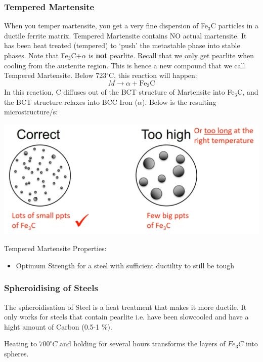 \documentclass[12pt]{article}
\begin{document}
\subsubsection{Tempered Martensite}
When you temper martensite, you get a very fine dispersion of Fe$_3$C particles in a ductile ferrite matrix.
Tempered Martensite contains NO actual martensite.
It has been heat treated (tempered) to `push' the metastable phase into stable phases.
Note that Fe$_3$C$+\alpha$ is \textbf{not} pearlite. 
Recall that we only get pearlite when cooling from the austenite region.
This is hence a new compound that we call Tempered Martensite.
Below 723$^\circ$C, this reaction will happen:
\begin{equation*}
  M \rightarrow \alpha + \text{Fe}_3\text{C}
\end{equation*}
In this reaction, C diffuses out of the BCT structure of Martensite into Fe$_3$C, and the BCT structure relaxes into BCC Iron ($\alpha$).
Below is the resulting microstructure/s:

\includegraphics[scale=0.3]{martensite}

Tempered Martensite Properties:
\begin{itemize}
  \item Optimum Strength for a steel with sufficient ductility to still be tough
\end{itemize}

\subsubsection{Spheroidising of Steels}
The spheroidisation of Steel is a heat treatment that makes it more ductile.
It only works for steels that contain pearlite i.e. have been slowcooled and have a hight amount of Carbon (0.5-1 \%).

\begin{center}
Heating to $700^\circ C$ and holding for several hours transforms the layers of $Fe_3C$ into spheres.
\end{center}
\end{document}
